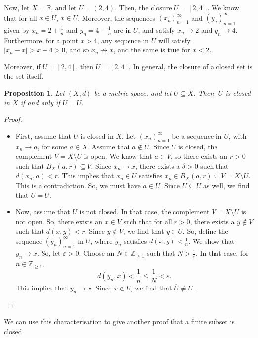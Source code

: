 \documentclass[a4paper, openany]{memoir}
\theoremstyle{definition}
\theoremstyle{plain}
\newtheorem{proposition}[definition]{Proposition}
\begin{document}
Now, let $X = \mathbb{R}$, and let $U = (2, 4)$. Then, the closure $\overline{U} = [2, 4]$. We know that for all $x \in U$, $x \in \overline{U}$. Moreover, the sequences $(x_n)_{n=1}^{\infty}$ and $(y_n)_{n=1}^{\infty}$ given by $x_n = 2 + \frac{1}{n}$ and $y_n = 4 - \frac{1}{n}$ are in $U$, and satisfy $x_n \to 2$ and $y_n \to 4$. Furthermore, for a point $x > 4$, any sequence in $U$ will satisfy $|x_n - x| > x - 4 > 0$, and so $x_n \not\to x$, and the same is true for $x < 2$.

Moreover, if $U = [2, 4]$, then $\overline{U} = [2, 4]$. In general, the closure of a closed set is the set itself.
\begin{proposition}
Let $(X, d)$ be a metric space, and let $U \subseteq X$. Then, $U$ is closed in $X$ if and only if $\overline{U} = U$.
\end{proposition}
\begin{proof}
\hspace*{0pt}
\begin{itemize}
    \item First, assume that $U$ is closed in $X$. Let $(x_n)_{n=1}^{\infty}$ be a sequence in $U$, with $x_n \to a$, for some $a \in X$. Assume that $a \not\in U$. Since $U$ is closed, the complement $V = X \setminus U$ is open. We know that $a \in V$, so there exists an $r > 0$ such that $B_X(a, r) \subseteq V$. Since $x_n \to x$, there exists a $\delta > 0$ such that $d(x_n, a) < r$. This implies that $x_n \in U$ satisfies $x_n \in B_X(a, r) \subseteq V = X \setminus U$. This is a contradiction. So, we must have $a \in U$. Since $U \subseteq \overline{U}$ as well, we find that $\overline{U} = U$.
    
    \item Now, assume that $U$ is not closed. In that case, the complement $V = X \setminus U$ is not open. So, there exists an $x \in V$ such that for all $r > 0$, there exists a $y \not\in V$ such that $d(x, y) < r$. Since $y \not\in V$, we find that $y \in U$. So, define the sequence $(y_n)_{n=1}^{\infty}$ in $U$, where $y_n$ satisfies $d(x, y) < \frac{1}{n}$. We show that $y_n \to x$. So, let $\varepsilon > 0$. Choose an $N \in \mathbb{Z}_{\geqslant 1}$ such that $N > \frac{1}{\varepsilon}$. In that case, for $n \in \mathbb{Z}_{\geqslant 1}$, 
    \[d(y_n, x) < \frac{1}{n} \leqslant \frac{1}{N} < \varepsilon.\]
    This implies that $y_n \to x$. Since $x \not\in U$, we find that $\overline{U} \neq U$.
\end{itemize}
\end{proof}
\noindent We can use this characterisation to give another proof that a finite subset is closed.
\end{document}
